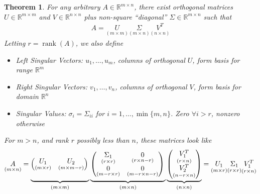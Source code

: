 \documentclass[12pt]{book}
\numberwithin{equation}{section} %
\theoremstyle{plain}
\newtheorem{thm}{Theorem}[section]
\theoremstyle{definition}
\theoremstyle{remark}
\newcommand{\Rn}{\mathbb{R}^n}
\newcommand{\Rm}{\mathbb{R}^m}
\newcommand{\Rmn}{\mathbb{R}^{m\times n}}
\newcommand{\Rmm}{\mathbb{R}^{m\times m}}
\newcommand{\Rnn}{\mathbb{R}^{n\times n}}
\newcommand{\rank}{\operatorname{rank}}
\begin{document}
\begin{thm}
For any arbitrary $A\in\Rmn$, there exist orthogonal matrices $U\in\Rmm$
and $V\in\Rnn$ plus non-square ``diagonal'' $\Sigma\in\Rmn$ such that
\begin{align*}
  A
  =
  \underset{(m\times m)}{U}
  \underset{(m\times n)}{\Sigma}
  \underset{(n\times n)}{V^T}
\end{align*}
Letting $r=\rank(A)$, we also define
\begin{itemize}
  \item \emph{Left Singular Vectors}: $u_1,\ldots,u_m$, columns of
    orthogonal $U$, form basis for range $\Rm$
  \item \emph{Right Singular Vectors}: $v_1,\ldots,v_n$, columns of
    orthogonal $V$, form basis for domain $\Rn$
  \item \emph{Singular Values}: $\sigma_i=\Sigma_{ii}$ for
    $i=1,\ldots,\min\{m,n\}$. Zero $\forall i> r$, nonzero
    otherwise
\end{itemize}
For $m>n$, and rank $r$ possibly less than $n$, these matrices look like
\begin{align}
  \underset{(m\times n)}{A}
  =
  \underbrace{%
    \begin{pmatrix}
      \underset{(m\times r)}{U_1}
      &
      \underset{(m\times m-r)}{U_2}
    \end{pmatrix}
    \vphantom{%
    \begin{pmatrix}
      \underset{(r\times n)}{V_1^T}
      \\
      \underset{(n-r\times n)}{V^T_2}
    \end{pmatrix}
    }
  }_{(m\times m)}
  \underbrace{%
    \begin{pmatrix}
      \underset{(r\times r)}{\Sigma_1}
      &
      \underset{(r\times n-r)}{0}
      \\
      \underset{(m-r\times r)}{0}
      &
      \underset{(m-r\times n-r)}{0}
    \end{pmatrix}
    \vphantom{%
    \begin{pmatrix}
      \underset{(r\times n)}{V_1^T}
      \\
      \underset{(n-r\times n)}{V^T_2}
    \end{pmatrix}
    }
  }_{(m\times n)}
  \underbrace{%
    \begin{pmatrix}
      \underset{(r\times n)}{V_1^T}
      \\
      \underset{(n-r\times n)}{V^T_2}
    \end{pmatrix}
  }_{(n\times n)}
  =
  \underset{(m\times r)}{U_1}
  \underset{(r\times r)}{\Sigma_1}
  \underset{(r\times n)}{V_1^T}
  \label{svd}
\end{align}
\end{thm}
\end{document}
